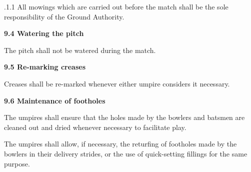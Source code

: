 \documentclass[12pt]{article}
\begin{document}
\vspace{\baselineskip}
\begin{adjustwidth}{1.18in}{0.44in}
{\fontsize{9pt}{10.8pt}.1.1 \tabto{1.17in} All mowings which are carried out before the match shall be the sole responsibility of the Ground Authority.\par}\par

\end{adjustwidth}


\vspace{\baselineskip}
{\fontsize{11pt}{13.2pt}\selectfont \textbf{9.4 \tabto{0.47in} Watering the pitch}\par}\par


\vspace{\baselineskip}
{\fontsize{9pt}{10.8pt}\selectfont The pitch shall not be watered during the match.\par}\par


\vspace{\baselineskip}
{\fontsize{11pt}{13.2pt}\selectfont \textbf{9.5 \tabto{0.47in} Re-marking creases}\par}\par


\vspace{\baselineskip}
{\fontsize{9pt}{10.8pt}\selectfont Creases shall be re-marked whenever either umpire considers it necessary.\par}\par


\vspace{\baselineskip}
{\fontsize{11pt}{13.2pt}\selectfont \textbf{9.6 \tabto{0.47in} Maintenance of footholes}\par}\par


\vspace{\baselineskip}
\begin{adjustwidth}{0.0in}{0.33in}
{\fontsize{9pt}{10.8pt}\selectfont The umpires shall ensure that the holes made by the bowlers and batsmen are cleaned out and dried whenever necessary to facilitate play.\par}\par

\end{adjustwidth}


\vspace{\baselineskip}
\begin{adjustwidth}{0.0in}{0.18in}
{\fontsize{9pt}{10.8pt}\selectfont The umpires shall allow, if necessary, the returfing of footholes made by the bowlers in their delivery strides, or the use of quick-setting fillings for the same purpose.\par}\par

\end{adjustwidth}
\end{document}
